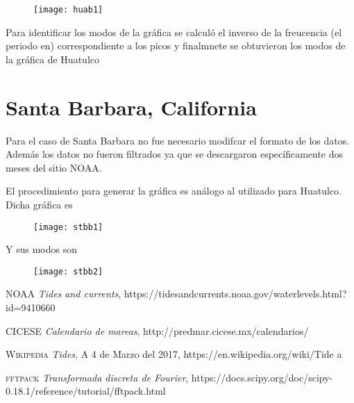 \documentclass[12pt]{article}
\begin{document}
\begin{figure}[ht]
\texttt{[image: huab1]}
\centering
\end{figure}

Para identificar los modos de la gráfica se calculó el inverso de la freucencia (el periodo en) correspondiente a los picos y finalmnete se obtuvieron los modos de la gráfica de Huatulco
\newpage 

\section*{Santa Barbara, California}
Para el caso de Santa Barbara no fue necesario modifcar el formato  de los datos. Además los datos no fueron filtrados ya que se descargaron específicamente dos meses del sitio NOAA.

El procedimiento para generar la gráfica es análogo al utilizado para Huatulco. Dicha gráfica es 


\begin{figure}[ht]
\texttt{[image: stbb1]}
\centering
\end{figure}
\newpage
Y sus modos son


\begin{figure}[ht]
\texttt{[image: stbb2]}
\centering
\end{figure}



\newpage 
\renewcommand{\refname}{\section*{Bibliografía}}
\begin{thebibliography}{9}

 \textsc{NOAA}
\textit{Tides and currents}, https://tidesandcurrents.noaa.gov/waterlevels.html?id=9410660 

 \textsc{CICESE}
\textit{Calendario de mareas}, http://predmar.cicese.mx/calendarios/


 \textsc{Wikipedia}
\textit{Tides}, A 4 de Marzo del 2017, https://en.wikipedia.org/wiki/Tide a 

 \textsc{fftpack}
\textit{Transformada discreta de Fourier}, https://docs.scipy.org/doc/scipy-0.18.1/reference/tutorial/fftpack.html











\end{thebibliography}
\end{document}

